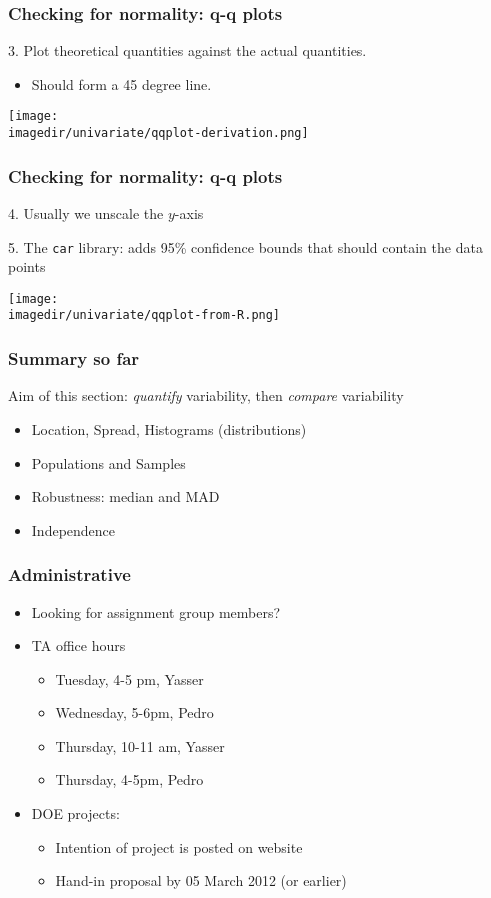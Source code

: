 \begin{frame}\frametitle{Checking for normality: q-q plots}

	3. Plot theoretical quantities against the actual quantities.
	\begin{itemize}
		\item Should form a 45 degree line.
	\end{itemize}
	\begin{center}
		\texttt{[image: \\imagedir/univariate/qqplot-derivation.png]}
	\end{center}
\end{frame}

\begin{frame}\frametitle{Checking for normality: q-q plots}

	4. Usually we unscale the $y$-axis

	5. The \texttt{car} library: adds 95\% confidence bounds that should contain the data points

	\texttt{[image: \\imagedir/univariate/qqplot-from-R.png]}
\end{frame}

\begin{frame}\frametitle{Summary so far}

	Aim of this section: \emph{quantify} variability, then \emph{compare} variability
	\begin{itemize}
		\item Location, Spread, Histograms (distributions)
		\item Populations and Samples
		\item Robustness: median and MAD
		\item Independence
	\end{itemize}
\end{frame}

\begin{frame}\frametitle{Administrative}
	\begin{itemize}
		\item Looking for assignment group members?
		\item TA office hours
		\begin{itemize}
			\item Tuesday, 4-5 pm, Yasser
			\item Wednesday, 5-6pm, Pedro
			\item Thursday, 10-11 am, Yasser
			\item Thursday, 4-5pm, Pedro
		\end{itemize}
		\item DOE projects:
		\begin{itemize}
			\item Intention of project is posted on website
			\item Hand-in proposal by 05 March 2012 (or earlier)
		\end{itemize}
	\end{itemize}
\end{frame}


